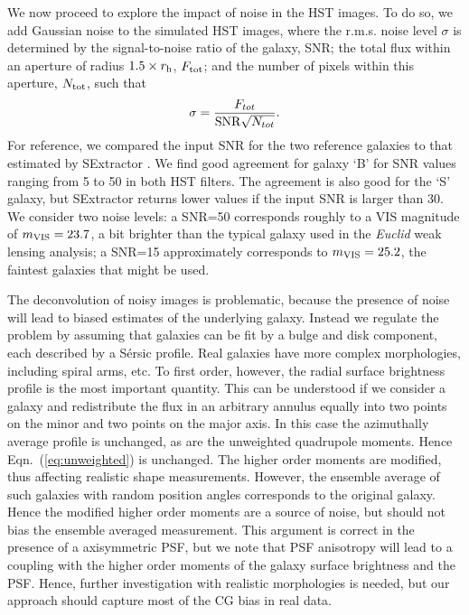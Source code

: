 \documentclass[useAMS,usenatbib]{mnras}
\newcommand{\be}{\begin{equation}}
\newcommand{\ee}{\end{equation}}
\begin{document}
We now proceed to explore the impact of noise in the HST images. To do so, we add Gaussian noise to the simulated HST images, where the r.m.s. noise level $\sigma$ is determined by the signal-to-noise ratio of the galaxy, SNR; the total flux within an aperture of radius $1.5\times r_{\rm h}$, $F_{\rm tot}$; and the number of pixels within this aperture, $N_{\rm tot}$, such that
%
\be
\sigma = {F_{tot} \over {\rm SNR} \sqrt{N_{tot}} }.
\ee
%
For reference, we compared the input SNR for the two reference galaxies
to that estimated by {\sc SExtractor} \citep{Bertin96}.
We find good agreement for galaxy `B' for SNR values ranging from 5 to 50
in both HST filters. The agreement is also good for the `S' galaxy, but 
{\textsc SExtractor} returns lower values if the input SNR is larger than 30.
We consider two noise levels: a SNR=50 corresponds roughly to a 
VIS magnitude of $m_{\rm VIS}=23.7$, a bit brighter than the typical
galaxy used in the {\it Euclid} weak lensing analysis; a SNR=15 approximately 
corresponds to $m_{\rm VIS}=25.2$, the faintest galaxies that might be used.

The deconvolution of noisy images is problematic, because the presence of noise will lead to biased estimates of the underlying galaxy. Instead we regulate the problem by assuming that galaxies can be fit by a bulge and disk component, each described by a S{\'e}rsic profile. Real galaxies have more complex morphologies, including spiral arms, etc. To first order, however, the radial surface brightness profile is the most important quantity. This can be understood if we consider a galaxy and redistribute the flux in an arbitrary annulus equally into two points on the minor and two points on the major axis. In this case the azimuthally average profile is unchanged, as are the unweighted quadrupole moments. Hence Eqn.~(\ref{eq:unweighted}) is unchanged. The higher order moments are modified, thus affecting realistic shape measurements. However, the ensemble average of such galaxies with random position angles corresponds to the original galaxy. Hence the modified higher order moments are a source of noise, but should not bias the ensemble averaged measurement. This argument is correct in the presence of a axisymmetric PSF, but we note that PSF anisotropy will lead to a coupling with the higher order moments of the galaxy surface brightness and the PSF. Hence, further investigation with realistic morphologies is needed, but our approach should capture most of the CG bias in real data.
\end{document}
